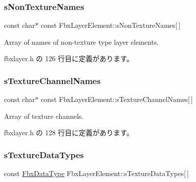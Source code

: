 \subsubsection{\texorpdfstring{s\+Non\+Texture\+Names}{sNonTextureNames}}
{\footnotesize\ttfamily const char$\ast$ const Fbx\+Layer\+Element\+::s\+Non\+Texture\+Names\mbox{[}$\,$\mbox{]}\hspace{0.3cm}{\ttfamily [static]}}



Array of names of non-\/texture type layer elements. 



 fbxlayer.\+h の 126 行目に定義があります。

\mbox{\label{class_fbx_layer_element_abebd9e62e1c7b06e471cf00173904aec}} 
\subsubsection{\texorpdfstring{s\+Texture\+Channel\+Names}{sTextureChannelNames}}
{\footnotesize\ttfamily const char$\ast$ const Fbx\+Layer\+Element\+::s\+Texture\+Channel\+Names\mbox{[}$\,$\mbox{]}\hspace{0.3cm}{\ttfamily [static]}}



Array of texture channels. 



 fbxlayer.\+h の 128 行目に定義があります。

\mbox{\label{class_fbx_layer_element_a8fd9e526f65ca7e33947c9fba6a7e0d0}} 
\subsubsection{\texorpdfstring{s\+Texture\+Data\+Types}{sTextureDataTypes}}
{\footnotesize\ttfamily const \hyperlink{class_fbx_data_type}{Fbx\+Data\+Type} Fbx\+Layer\+Element\+::s\+Texture\+Data\+Types\mbox{[}$\,$\mbox{]}\hspace{0.3cm}{\ttfamily [static]}}



